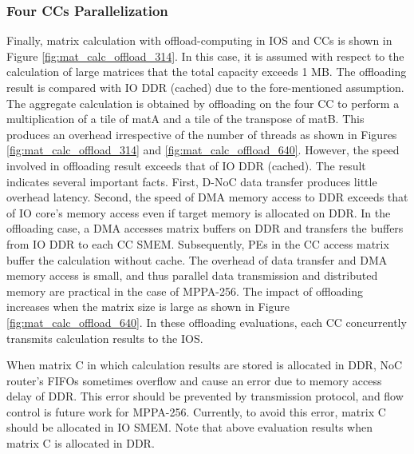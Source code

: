 \documentclass[conference,compsoc]{IEEEtran}
\newcommand{\comment}[1]{}
\begin{document}
\subsubsection{Four CCs Parallelization}
\label{sec:four_CCs}
Finally, matrix calculation with offload-computing in IOS and CCs is shown in Figure \ref{fig:mat_calc_offload_314}.
In this case, it is assumed with respect to the calculation of large matrices that the total capacity exceeds 1 MB.
The offloading result is compared with IO DDR (cached) due to the fore-mentioned assumption.
The aggregate calculation is obtained by offloading on the four CC to perform a multiplication of a tile of matA and a tile of the transpose of matB.
This produces an overhead irrespective of the number of threads as shown in Figures \ref{fig:mat_calc_offload_314} and \ref{fig:mat_calc_offload_640}.
However, the speed involved in offloading result exceeds that of IO DDR (cached).
The result indicates several important facts.
First, D-NoC data transfer produces little overhead latency.
Second, the speed of DMA memory access to DDR exceeds that of IO core's memory access even if target memory is allocated on DDR.
In the offloading case, a DMA accesses matrix buffers on DDR and transfers the buffers from IO DDR to each CC SMEM.
Subsequently, PEs in the CC access matrix buffer the calculation without cache.
The overhead of data transfer and DMA memory access is small, and thus parallel data transmission and distributed memory are practical in the case of MPPA-256.
The impact of offloading increases when the matrix size is large as shown in Figure \ref{fig:mat_calc_offload_640}.
In these offloading evaluations, each CC concurrently transmits calculation results to the IOS.
\comment{1-22}
When matrix C in which calculation results are stored is allocated in DDR, NoC router's FIFOs sometimes overflow and cause an error due to memory access delay of DDR.
This error should be prevented by transmission protocol, and flow control is future work for MPPA-256.
Currently, to avoid this error, matrix C should be allocated in IO SMEM.
Note that above evaluation results when matrix C is allocated in DDR.
\end{document}
